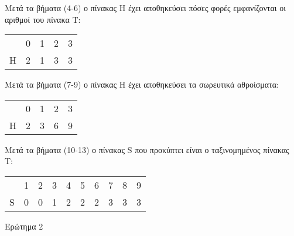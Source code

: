 \documentclass[a4paper, fleqn]{article}
\begin{document}
Μετά τα βήματα (4-6) ο πίνακας H έχει αποθηκεύσει πόσες φορές εμφανίζονται οι αριθμοί του πίνακα T:
\begin{center}
\begin{tabular}{r|c|c|c|c|}
\multicolumn{1}{r}{} & \multicolumn{1}{c}{0} & \multicolumn{1}{c}{1} & \multicolumn{1}{c}{2} & \multicolumn{1}{c}{3} \\
\cline{2-5}
H & 2 & 1 & 3 & 3 \\
\cline{2-5}
\end{tabular}\par
\end{center}
Μετά τα βήματα (7-9) ο πίνακας H έχει αποθηκεύσει τα σωρευτικά αθροίσματα:
\begin{center}
\begin{tabular}{r|c|c|c|c|}
\multicolumn{1}{r}{} & \multicolumn{1}{c}{0} & \multicolumn{1}{c}{1} & \multicolumn{1}{c}{2} & \multicolumn{1}{c}{3} \\
\cline{2-5}
H & 2 & 3 & 6 & 9 \\
\cline{2-5}
\end{tabular}\par
\end{center}
Μετά τα βήματα (10-13) ο πίνακας S που προκύπτει είναι ο ταξινομημένος πίνακας T:
\begin{center}
\begin{tabular}{r|c|c|c|c|c|c|c|c|c|}
\multicolumn{1}{r}{} & \multicolumn{1}{c}{1} & \multicolumn{1}{c}{2} & \multicolumn{1}{c}{3} & \multicolumn{1}{c}{4} & \multicolumn{1}{c}{5} & \multicolumn{1}{c}{6} & \multicolumn{1}{c}{7} & \multicolumn{1}{c}{8} & \multicolumn{1}{c}{9}\\
\cline{2-10}
S & 0 & 0 & 1 & 2 & 2 & 2 & 3 & 3 & 3\\
\cline{2-10}
\end{tabular}\par
\end{center}











\pagebreak

Ερώτημα 2
\end{document}
